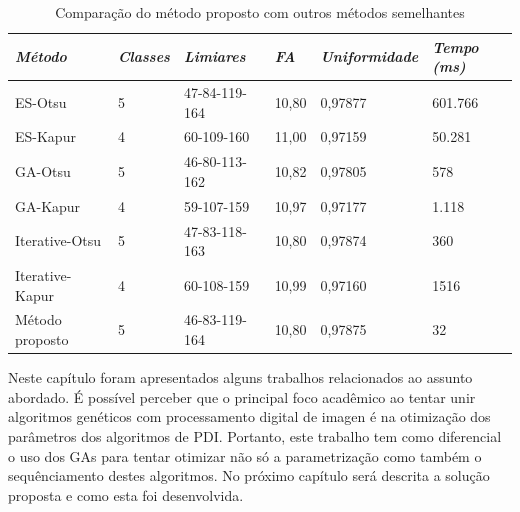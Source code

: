 \documentclass[12pt,oneside,a4paper,english,french,spanish,brazil,]{abntex2}
\begin{document}
\begin{table}
\centering
\caption{Comparação do método proposto com outros métodos semelhantes}
\label{tab:TrCo_Bammouche_Resultados}
\begin{tabular}{llllll}
\hline
\textit{\textbf{\small{Método}}} & \textit{\textbf{\small{Classes}}} & \textit{\textbf{\small{Limiares}}} & \textit{\textbf{\small{FA}}} & \textit{\textbf{\small{Uniformidade}}} & \textit{\textbf{\small{Tempo (ms)}}} \\ \hline
ES-Otsu                  & 5                                   & 47-84-119-164                          & 10,80                           & 0,97877                        & 601.766                             \\
ES-Kapur                 & 4                                   & 60-109-160                             & 11,00                           & 0,97159                        & 50.281                              \\
GA-Otsu                  & 5                                   & 46-80-113-162                          & 10,82                           & 0,97805                        & 578                                 \\
GA-Kapur                 & 4                                   & 59-107-159                             & 10,97                           & 0,97177                        & 1.118                               \\
Iterative-Otsu           & 5                                   & 47-83-118-163                          & 10,80                           & 0,97874                        & 360                                 \\
Iterative-Kapur          & 4                                   & 60-108-159                             & 10,99                           & 0,97160                        & 1516                                \\
Método proposto          & 5                                   & 46-83-119-164                          & 10,80                           & 0,97875                        & 32                                  \\ \hline
\end{tabular}
\end{table}

Neste capítulo foram apresentados alguns trabalhos relacionados ao assunto abordado. É possível perceber que o principal foco acadêmico ao tentar unir algoritmos genéticos com processamento digital de imagen é na otimização dos parâmetros dos algoritmos de PDI. Portanto, este trabalho tem como diferencial o uso dos GAs para tentar otimizar não só a parametrização como também o sequênciamento destes algoritmos. No próximo capítulo será descrita a solução proposta e como esta foi desenvolvida.
\end{document}
